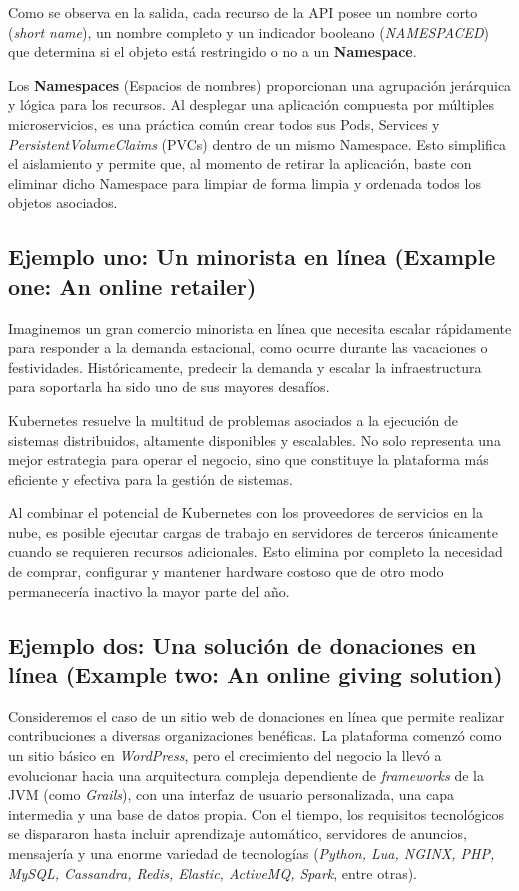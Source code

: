 Como se observa en la salida, cada recurso de la API posee un nombre corto (\textit{short name}), un nombre completo y un indicador booleano (\textit{NAMESPACED}) que determina si el objeto está restringido o no a un \textbf{Namespace}.

Los \textbf{Namespaces} (Espacios de nombres) proporcionan una agrupación jerárquica y lógica para los recursos. Al desplegar una aplicación compuesta por múltiples microservicios, es una práctica común crear todos sus Pods, Services y \textit{PersistentVolumeClaims} (PVCs) dentro de un mismo Namespace. Esto simplifica el aislamiento y permite que, al momento de retirar la aplicación, baste con eliminar dicho Namespace para limpiar de forma limpia y ordenada todos los objetos asociados.

\subsection{Ejemplo uno: Un minorista en línea (Example one: An online retailer)}

Imaginemos un gran comercio minorista en línea que necesita escalar rápidamente para responder a la demanda estacional, como ocurre durante las vacaciones o festividades. Históricamente, predecir la demanda y escalar la infraestructura para soportarla ha sido uno de sus mayores desafíos. 

Kubernetes resuelve la multitud de problemas asociados a la ejecución de sistemas distribuidos, altamente disponibles y escalables. No solo representa una mejor estrategia para operar el negocio, sino que constituye la plataforma más eficiente y efectiva para la gestión de sistemas. 

Al combinar el potencial de Kubernetes con los proveedores de servicios en la nube, es posible ejecutar cargas de trabajo en servidores de terceros únicamente cuando se requieren recursos adicionales. Esto elimina por completo la necesidad de comprar, configurar y mantener hardware costoso que de otro modo permanecería inactivo la mayor parte del año.

\subsection{Ejemplo dos: Una solución de donaciones en línea (Example two: An online giving solution)}

Consideremos el caso de un sitio web de donaciones en línea que permite realizar contribuciones a diversas organizaciones benéficas. La plataforma comenzó como un sitio básico en \textit{WordPress}, pero el crecimiento del negocio la llevó a evolucionar hacia una arquitectura compleja dependiente de \textit{frameworks} de la JVM (como \textit{Grails}), con una interfaz de usuario personalizada, una capa intermedia y una base de datos propia. Con el tiempo, los requisitos tecnológicos se dispararon hasta incluir aprendizaje automático, servidores de anuncios, mensajería y una enorme variedad de tecnologías (\textit{Python, Lua, NGINX, PHP, MySQL, Cassandra, Redis, Elastic, ActiveMQ, Spark}, entre otras).

